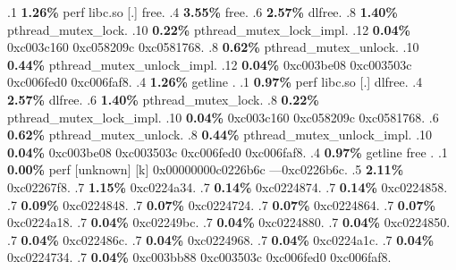 \begin{profile}
{.1 \textbf{ 1.26\%} perf             libc.so                [.] free. 
.4 \textbf{3.55\%} free. 
.6 \textbf{2.57\%} dlfree. 
.8 \textbf{1.40\%} pthread\_mutex\_lock. 
.10 \textbf{0.22\%} pthread\_mutex\_lock\_impl. 
.12 \textbf{0.04\%} 0xc003c160\newline {} 0xc058209c\newline {} 0xc0581768. 
.8 \textbf{0.62\%} pthread\_mutex\_unlock. 
.10 \textbf{0.44\%} pthread\_mutex\_unlock\_impl. 
.12 \textbf{0.04\%} 0xc003be08\newline {} 0xc003503c\newline {} 0xc006fed0\newline {} 0xc006faf8. 
.4 \textbf{1.26\%} getline\newline {} . 
.1 \textbf{ 0.97\%} perf             libc.so                [.] dlfree. 
.4 \textbf{2.57\%} dlfree. 
.6 \textbf{1.40\%} pthread\_mutex\_lock. 
.8 \textbf{0.22\%} pthread\_mutex\_lock\_impl. 
.10 \textbf{0.04\%} 0xc003c160\newline {} 0xc058209c\newline {} 0xc0581768. 
.6 \textbf{0.62\%} pthread\_mutex\_unlock. 
.8 \textbf{0.44\%} pthread\_mutex\_unlock\_impl. 
.10 \textbf{0.04\%} 0xc003be08\newline {} 0xc003503c\newline {} 0xc006fed0\newline {} 0xc006faf8. 
.4 \textbf{0.97\%} getline\newline {} free\newline {} . 
.1 \textbf{ 0.00\%} perf             [unknown]              [k] 0x00000000c0226b6c\newline {} ---0xc0226b6c. 
.5 \textbf{2.11\%} 0xc02267f8. 
.7 \textbf{1.15\%} 0xc0224a34. 
.7 \textbf{0.14\%} 0xc0224874. 
.7 \textbf{0.14\%} 0xc0224858. 
.7 \textbf{0.09\%} 0xc0224848. 
.7 \textbf{0.07\%} 0xc0224724. 
.7 \textbf{0.07\%} 0xc0224864. 
.7 \textbf{0.07\%} 0xc0224a18. 
.7 \textbf{0.04\%} 0xc02249bc. 
.7 \textbf{0.04\%} 0xc0224880. 
.7 \textbf{0.04\%} 0xc0224850. 
.7 \textbf{0.04\%} 0xc022486c. 
.7 \textbf{0.04\%} 0xc0224968. 
.7 \textbf{0.04\%} 0xc0224a1c. 
.7 \textbf{0.04\%} 0xc0224734. 
.7 \textbf{0.04\%} 0xc003bb88\newline {} 0xc003503c\newline {} 0xc006fed0\newline {} 0xc006faf8. 
}
\end{profile}
